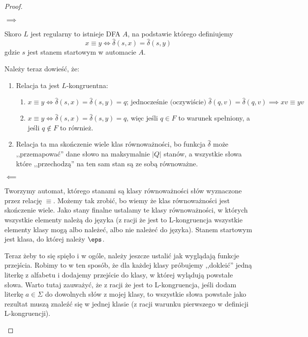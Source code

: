 \begin{proof} \( \)
	\begin{description}
		\item \( \implies \)

		      Skoro \( L \) jest regularny to istnieje DFA \( A \), na podstawie którego definiujemy
		      \[
			      x \equiv y \iff \hat \delta(s, x) = \hat \delta(s, y)
		      \]
		      gdzie \(s\) jest stanem startowym w automacie \(A\).

		      Należy teraz dowieść, że:

		      \begin{enumerate}
			      \item Relacja ta jest \(L\)-kongruentna: \begin{enumerate}
				            \item \(x \equiv y \iff \hat \delta(s, x) = \hat \delta(s, y) = q \text{; jednocześnie (oczywiście) } \hat \delta(q, v) = \hat \delta(q, v) \implies xv \equiv yv\)
				            \item \(x \equiv y \iff \hat \delta(s, x) = \hat \delta(s, y) = q \), więc jeśli \(q \in F\) to warunek spełniony, a jeśli \(q \not \in F\) to również.

			            \end{enumerate}

			      \item Relacja ta ma skończenie wiele klas równoważności, bo funkcja \( \hat \delta \) może ,,przemapować'' dane słowo na maksymalnie \( |Q| \) stanów, a wszystkie słowa które ,,przechodzą'' na ten sam stan są ze sobą równoważne.

		      \end{enumerate}

		\item \( \impliedby \)

		      Tworzymy automat, którego stanami są klasy równoważności słów wyznaczone przez relację \( \equiv \). Możemy tak zrobić, bo wiemy że klas równoważności jest skończenie wiele. Jako stany finalne ustalamy te klasy równoważności, w których wszystkie elementy należą do języka (z racji że jest to L-kongruencja wszystkie elementy klasy mogą albo należeć, albo nie należeć do języka). Stanem startowym jest klasa, do której należy \( \eps \).

		      Teraz żeby to się spięło i w ogóle, należy jeszcze ustalić jak wyglądają funkcje przejścia. Robimy to w ten sposób, że dla każdej klasy próbujemy ,,dokleić'' jedną literkę z alfabetu i dodajemy przejście do klasy, w której wylądują powstałe słowa. Warto tutaj zauważyć, że z racji że jest to L-kongruencja, jeśli dodam literkę \(a \in \Sigma \) do dowolnych słów z mojej klasy, to wszystkie słowa powstałe jako rezultat muszą znaleźć się w jednej klasie (z racji warunku pierwszego w definicji L-kongruencji).


\end{description}
\end{proof}

